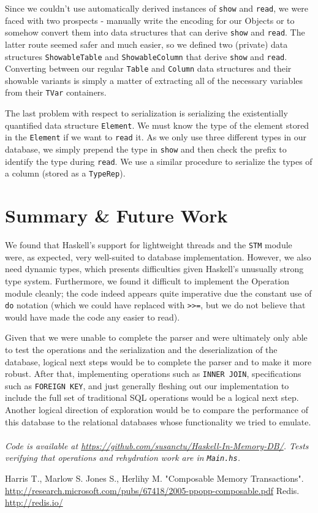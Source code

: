 \documentclass[10pt]{article}
\begin{document}
\begin{multicols}{2}
Since we couldn't use automatically derived instances of \texttt{show} and \texttt{read}, we were faced with two prospects - manually write the encoding for our Objects or to somehow convert them into data structures that can derive \texttt{show} and \texttt{read}. The latter route seemed safer and much easier, so we defined two (private) data structures \texttt{ShowableTable} and \texttt{ShowableColumn} that derive \texttt{show} and \texttt{read}. Converting between our regular \texttt{Table} and \texttt{Column} data structures and their showable variants is simply a matter of extracting all of the necessary variables from their \texttt{TVar} containers.

The last problem with respect to serialization is serializing the existentially quantified data structure \texttt{Element}. We must know the type of the element stored in the \texttt{Element} if we want to \texttt{read} it. As we only use three different types in our database, we simply prepend the type in \texttt{show} and then check the prefix to identify the type during \texttt{read}. We use a similar procedure to serialize the types of a column (stored as a \texttt{TypeRep}).

\section{Summary \& Future Work}
We found that Haskell's support for lightweight threads and the \texttt{STM} module were, as expected, very well-suited to database implementation. However, we also need dynamic types, which presents difficulties given Haskell's unusually strong type system. Furthermore, we found it difficult to implement the Operation module cleanly; the code indeed appears quite imperative due the constant use of \texttt{do} notation (which we could have replaced with \texttt{>>=}, but we do not believe that would have made the code any easier to read). 

Given that we were unable to complete the parser and were ultimately only able to test the operations and the serialization and the deserialization of the database, logical next steps would be to complete the parser and to make it more robust. After that, implementing operations such as \texttt{INNER JOIN}, specifications such as \texttt{FOREIGN KEY}, and just generally fleshing out our implementation to include the full set of traditional SQL operations would be a logical next step. Another logical direction of exploration would be to compare the performance of this database to the relational databases whose functionality we tried to emulate.\\\\
\textit{Code is available at \url{https://github.com/susanctu/Haskell-In-Memory-DB/}. Tests verifying that operations and rehydration work are in \texttt{Main.hs}.}
\end{multicols}

\begin{thebibliography}{1}

 Harris T., Marlow S. Jones S., Herlihy M. "Composable Memory Transactions". \url{http://research.microsoft.com/pubs/67418/2005-ppopp-composable.pdf}
 Redis. \url{http://redis.io/}

\end{thebibliography}
\end{document}
